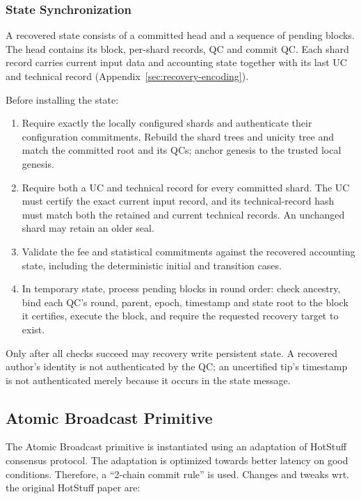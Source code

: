 \subsubsection{State Synchronization}\label{root-recovery-procedure}

A recovered state consists of a committed head and a sequence of pending blocks. The head contains its block, per-shard records, QC and commit QC. Each shard record carries current input data and accounting state together with its last UC and technical record (Appendix~\ref{sec:recovery-encoding}).

Before installing the state:
\begin{enumerate}
\item Require exactly the locally configured shards and authenticate their configuration commitments. Rebuild the shard trees and unicity tree and match the committed root and its QCs; anchor genesis to the trusted local genesis.
\item Require both a UC and technical record for every committed shard. The UC must certify the exact current input record, and its technical-record hash must match both the retained and current technical records. An unchanged shard may retain an older seal.
\item Validate the fee and statistical commitments against the recovered accounting state, including the deterministic initial and transition cases.
\item In temporary state, process pending blocks in round order: check ancestry, bind each QC's round, parent, epoch, timestamp and state root to the block it certifies, execute the block, and require the requested recovery target to exist.
\end{enumerate}
Only after all checks succeed may recovery write persistent state. A recovered author's identity is not authenticated by the QC; an uncertified tip's timestamp is not authenticated merely because it occurs in the state message.


\subsection{Atomic Broadcast Primitive}\label{sec:atomic-broadcast}

The Atomic Broadcast primitive is instantiated using an adaptation of HotStuff consensus protocol. The adaptation is optimized towards better latency on good conditions. Therefore, a ``2-chain commit rule'' is used. Changes and tweaks wrt. the original HotStuff paper are:

